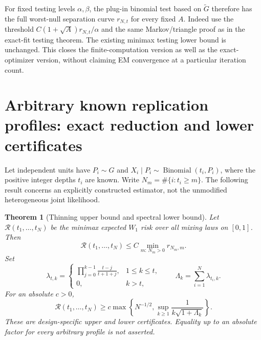 \documentclass[11pt,a4paper]{article}
\newtheorem{theorem}{Theorem}[section]
\theoremstyle{definition}
\theoremstyle{remark}
\numberwithin{equation}{section}
\begin{document}
For fixed testing levels $\alpha,\beta$, the plug-in binomial test
based on $\widetilde G$ therefore has the full worst-null separation
curve $r_{N,t}$ for every fixed $A$. Indeed use the threshold
$C(1+\sqrt A)r_{N,t}/\alpha$ and the same Markov/triangle proof as
in the exact-fit testing theorem. The existing minimax testing lower
bound is unchanged. This closes the finite-computation version as well
as the exact-optimizer version, without claiming EM convergence at a
particular iteration count.

\section{Arbitrary known replication profiles: exact reduction and lower certificates}
\label{E:upst:heterosec}

Let independent units have $P_i\sim G$ and
$X_i\mid P_i\sim\operatorname{Binomial}(t_i,P_i)$, where the positive
integer depths $t_i$ are known. Write $N_m=\#\{i:t_i\ge m\}$.
The following result concerns an explicitly constructed estimator,
not the unmodified heterogeneous joint likelihood.

\begin{theorem}[Thinning upper bound and spectral lower bound]
\label{E:upst:profile}
Let $\mathcal R(t_1,\ldots,t_N)$ be the minimax expected $W_1$ risk
over all mixing laws on $[0,1]$. Then
\begin{equation}\label{E:upst:profileupper}
 \mathcal R(t_1,\ldots,t_N)
 \le C\min_{m:\,N_m>0}r_{N_m,m}.
\end{equation}
Set
\[
 \lambda_{t,k}=\begin{cases}
 \displaystyle\prod_{j=0}^{k-1}\frac{t-j}{t+1+j},&1\le k\le t,\\
 0,&k>t,
 \end{cases}
 \qquad \Lambda_k=\sum_{i=1}^N\lambda_{t_i,k}.
\]
For an absolute $c>0$,
\begin{equation}\label{E:upst:profilelower}
 \mathcal R(t_1,\ldots,t_N)
 \ge c\max\left\{N^{-1/2},
             \sup_{k\ge1}\frac1{k\sqrt{1+\Lambda_k}}\right\}.
\end{equation}
These are design-specific upper and lower certificates. Equality up
to an absolute factor for every arbitrary profile is not asserted.
\end{theorem}
\end{document}
